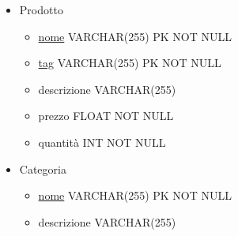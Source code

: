 \documentclass[11pt]{article}
\begin{document}
\begin{itemize}
\begin{adjustwidth}{2em}{0pt}
			L'entità Lista si specializza in due sottocategorie con una 
			generalizzazione totale:

			\renewcommand{\labelitemii}{\textbullet}
			\renewcommand{\labelitemiii}{-}
			\renewcommand{\labelitemiv}{$\square$}


			\begin{itemize}
				\item Carrello
					\begin{itemize}
						\item nome VARCHAR(255) NOT NULL
					\end{itemize}

				\item Ordine
					\begin{itemize}
						\item numero INT NOT NULL

						\item dettagli pagamento: attributo composto:
							\begin{itemize}
								\item provider VARCHAR(255) NOT NULL
								\item status VARCHAR(255) NOT NULL
							\end{itemize}

					\end{itemize}
			\end{itemize}

		\end{adjustwidth}

	\item Prodotto
		\begin{itemize}
			\item \underline{nome} VARCHAR(255) PK NOT NULL
			\item \underline{tag} VARCHAR(255) PK NOT NULL
			\item descrizione VARCHAR(255)
			\item prezzo FLOAT NOT NULL
			\item quantità INT NOT NULL
		\end{itemize}

	\item Categoria
		\begin{itemize}
			\item \underline{nome} VARCHAR(255) PK NOT NULL
			\item descrizione VARCHAR(255)
		\end{itemize}
\end{itemize}
\end{document}
